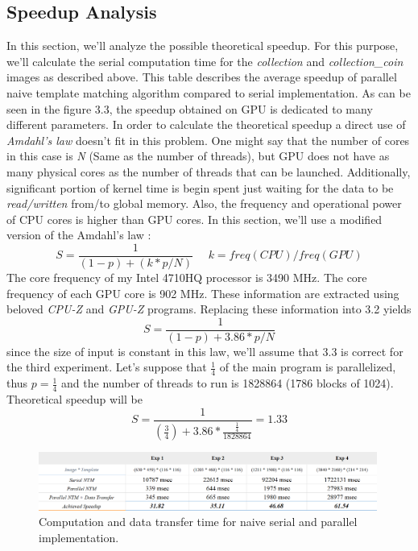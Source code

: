 \subsection{Speedup Analysis}
In this section, we'll analyze the possible theoretical speedup. For this purpose, we'll calculate the serial computation time for the \textit{collection} and \textit{collection\_coin} images as described above. This table describes the average speedup of parallel naive template matching algorithm compared to serial implementation. As can be seen in the figure 3.3, the speedup obtained on GPU is dedicated to many different parameters. In order to calculate the theoretical speedup a direct use of \textit{Amdahl's law} doesn't fit in this problem. One might say that the number of cores in this case is \textit{N} (Same as the number of threads), but GPU does not have as many physical cores as the number of threads that can be launched. Additionally, significant portion of kernel time is begin spent just waiting for the data to be \textit{read/written} from/to global memory. Also, the frequency and operational power of CPU cores is higher than GPU cores. In this section, we'll use a modified version of the Amdahl's law \cite{amdahl}:
\begin{equation}
	S = \frac{1}{(1 - p) + (k * p / N)} \ \ \ \ \  \ k = freq(CPU) / freq(GPU)
\end{equation}
The core frequency of my Intel 4710HQ processor is 3490 MHz. The core frequency of each GPU core is 902 MHz. These information are extracted using beloved \textit{CPU-Z} and \textit{GPU-Z} programs. Replacing these information into 3.2 yields
\begin{equation}
	S = \frac{1}{(1 - p) + 3.86 * p / N}
\end{equation}
since the size of input is constant in this law, we'll assume that 3.3 is correct for the third experiment. Let's suppose that $\frac{1}{4}$ of the main program is parallelized, thus $p = \frac{1}{4}$ and the number of threads to run is 1828864 (1786 blocks of 1024). Theoretical speedup will be
\begin{equation}
	S = \frac{1}{(\frac{3}{4}) + 3.86 * \frac{\frac{1}{4}}{1828864}} = 1.33
\end{equation}
\begin{figure}[!h]\centering
	\includegraphics[width=0.99\textwidth]{speedup.PNG}
	\caption{Computation and data transfer time for naive serial and parallel implementation.}
	\label{pl1}
\end{figure}